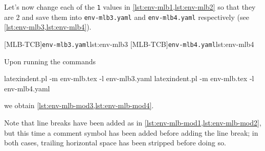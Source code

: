   \begin{example}
  Let's now change each of the \texttt{1} values in \cref{lst:env-mlb1,lst:env-mlb2} so
  that they are $2$ and save them into \texttt{env-mlb3.yaml} and \texttt{env-mlb4.yaml}
  respectively (see \cref{lst:env-mlb3,lst:env-mlb4}). 

  \begin{cmhtcbraster}
   [MLB-TCB]{\texttt{env-mlb3.yaml}}{lst:env-mlb3}
   [MLB-TCB]{\texttt{env-mlb4.yaml}}{lst:env-mlb4}
  \end{cmhtcbraster}

  Upon running the commands

  \begin{commandshell}
latexindent.pl -m env-mlb.tex -l env-mlb3.yaml
latexindent.pl -m env-mlb.tex -l env-mlb4.yaml
\end{commandshell}

  we obtain \cref{lst:env-mlb-mod3,lst:env-mlb-mod4}.

  \begin{widepage}
   \begin{minipage}{.56\linewidth}
   \end{minipage}
   \hfill
   \begin{minipage}{.43\linewidth}
   \end{minipage}
  \end{widepage}

  Note that line breaks have been added as in \cref{lst:env-mlb-mod1,lst:env-mlb-mod2},
  but this time a comment symbol has been added before adding the line break; in both
  cases, trailing horizontal space has been stripped before doing so.
  \end{example}

